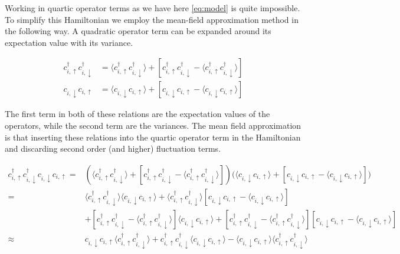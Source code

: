\documentclass[11pt]{article}
\begin{document}
Working in quartic operator terms as we have here \eqref{eq:model} is quite impossible. To simplify this Hamiltonian we employ the mean-field approximation method in the following way. A quadratic operator term can be expanded around its expectation value with its variance. 

\begin{align}
 c_{i, \uparrow}^{\dagger}c_{i, \downarrow}^{\dagger} &= \langle c_{i, \uparrow}^{\dagger}c_{i, \downarrow}^{\dagger} \rangle + [c_{i, \uparrow}^{\dagger}c_{i, \downarrow}^{\dagger} - \langle c_{i, \uparrow}^{\dagger}c_{i, \downarrow}^{\dagger} \rangle] \\ 
 c_{i, \downarrow}c_{i, \uparrow} &= \langle c_{i, \downarrow}c_{i, \uparrow} \rangle + [c_{i, \downarrow}c_{i, \uparrow} - \langle c_{i, \downarrow}c_{i, \uparrow} \rangle]
\end{align}

The first term in both of these relations are the expectation values of the operators, while the second term are the variances. The mean field approximation is that inserting these relations into the quartic operator term in the Hamiltonian and discarding second order (and higher) fluctuation terms. 

\begin{align}
	c_{i, \uparrow}^{\dagger}c_{i, \downarrow}^{\dagger} c_{i, \downarrow}c_{i, \uparrow} = &\left( \langle c_{i, \uparrow}^{\dagger}c_{i, \downarrow}^{\dagger} \rangle + [c_{i, \uparrow}^{\dagger}c_{i, \downarrow}^{\dagger} - \langle c_{i, \uparrow}^{\dagger}c_{i, \downarrow}^{\dagger} \rangle] \right) \Big( \langle c_{i, \downarrow}c_{i, \uparrow} \rangle + [c_{i, \downarrow}c_{i, \uparrow} - \langle c_{i, \downarrow}c_{i, \uparrow} \rangle] \Big) \\ %
=& \langle c_{i, \uparrow}^{\dagger}c_{i, \downarrow}^{\dagger} \rangle \langle c_{i, \downarrow}c_{i, \uparrow} \rangle +  \langle c_{i, \uparrow}^{\dagger}c_{i, \downarrow}^{\dagger} \rangle [c_{i, \downarrow}c_{i, \uparrow} - \langle c_{i, \downarrow}c_{i, \uparrow} \rangle] \nonumber \\
&+[c_{i, \uparrow}^{\dagger}c_{i, \downarrow}^{\dagger} - \langle c_{i, \uparrow}^{\dagger}c_{i, \downarrow}^{\dagger} \rangle]\langle c_{i, \downarrow}c_{i, \uparrow} \rangle + [c_{i, \uparrow}^{\dagger}c_{i, \downarrow}^{\dagger} - \langle c_{i, \uparrow}^{\dagger}c_{i, \downarrow}^{\dagger} \rangle][c_{i, \downarrow}c_{i, \uparrow} - \langle c_{i, \downarrow}c_{i, \uparrow} \rangle]  \nonumber \\
\approx& c_{i, \downarrow}c_{i, \uparrow} \langle c_{i, \uparrow}^{\dagger}c_{i, \downarrow}^{\dagger} \rangle  + c_{i, \uparrow}^{\dagger}c_{i, \downarrow}^{\dagger}\langle c_{i, \downarrow}c_{i, \uparrow} \rangle - \langle c_{i, \downarrow}c_{i, \uparrow} \rangle \langle c_{i, \uparrow}^{\dagger}c_{i, \downarrow}^{\dagger} \rangle
\end{align}
\end{document}
